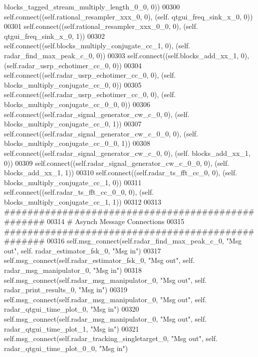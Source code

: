 \begin{DoxyCode}
      blocks_tagged_stream_multiply_length_0_0, 0))
00300         self.connect((self.rational_resampler_xxx_0, 0), (self.
      qtgui_freq_sink_x_0, 0))
00301         self.connect((self.rational_resampler_xxx_0_0, 0), (self.
      qtgui_freq_sink_x_0, 1))
00302         self.connect((self.blocks_multiply_conjugate_cc_1, 0), (self.
      radar_find_max_peak_c_0, 0))
00303         self.connect((self.blocks_add_xx_1, 0), (self.radar_usrp_echotimer_cc_0, 0))
00304         self.connect((self.radar_usrp_echotimer_cc_0, 0), (self.
      blocks_multiply_conjugate_cc_0, 0))
00305         self.connect((self.radar_usrp_echotimer_cc_0, 0), (self.
      blocks_multiply_conjugate_cc_0_0, 0))
00306         self.connect((self.radar_signal_generator_cw_c_0, 0), (self.
      blocks_multiply_conjugate_cc_0, 1))
00307         self.connect((self.radar_signal_generator_cw_c_0_0, 0), (self.
      blocks_multiply_conjugate_cc_0_0, 1))
00308         self.connect((self.radar_signal_generator_cw_c_0, 0), (self.
      blocks_add_xx_1, 0))
00309         self.connect((self.radar_signal_generator_cw_c_0_0, 0), (self.
      blocks_add_xx_1, 1))
00310         self.connect((self.radar_ts_fft_cc_0, 0), (self.
      blocks_multiply_conjugate_cc_1, 0))
00311         self.connect((self.radar_ts_fft_cc_0_0, 0), (self.
      blocks_multiply_conjugate_cc_1, 1))
00312 
00313         \textcolor{comment}{##################################################}
00314         \textcolor{comment}{# Asynch Message Connections}
00315         \textcolor{comment}{##################################################}
00316         self.msg\_connect(self.radar_find_max_peak_c_0, \textcolor{stringliteral}{"Msg out"}, self.
      radar_estimator_fsk_0, \textcolor{stringliteral}{"Msg in"})
00317         self.msg\_connect(self.radar_estimator_fsk_0, \textcolor{stringliteral}{"Msg out"}, self.
      radar_msg_manipulator_0, \textcolor{stringliteral}{"Msg in"})
00318         self.msg\_connect(self.radar_msg_manipulator_0, \textcolor{stringliteral}{"Msg out"}, self.
      radar_print_results_0, \textcolor{stringliteral}{"Msg in"})
00319         self.msg\_connect(self.radar_msg_manipulator_0, \textcolor{stringliteral}{"Msg out"}, self.
      radar_qtgui_time_plot_0, \textcolor{stringliteral}{"Msg in"})
00320         self.msg\_connect(self.radar_msg_manipulator_0, \textcolor{stringliteral}{"Msg out"}, self.
      radar_qtgui_time_plot_1, \textcolor{stringliteral}{"Msg in"})
00321         self.msg\_connect(self.radar_tracking_singletarget_0, \textcolor{stringliteral}{"Msg out"}, self.
      radar_qtgui_time_plot_0_0, \textcolor{stringliteral}{"Msg in"})

\end{DoxyCode}
